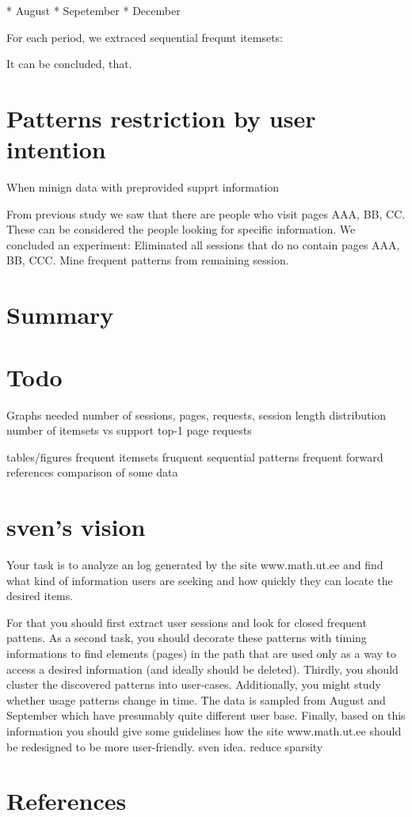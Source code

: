 \documentclass[english,a4paper]{article}
\begin{document}
* August
* Sepetember
* December

For each period, we extraced sequential frequnt itemsets:




It can be concluded, that.


\section{Patterns restriction by user intention}
When minign data with preprovided supprt information

From previous study we saw that there are people who visit pages AAA, BB, CC. These can be considered the people looking for specific information. We concluded an experiment:
Eliminated all sessions that do no contain pages AAA, BB, CCC.
Mine frequent patterns from remaining session.

\section{Summary}

\section{Todo}
Graphs needed
number of sessions, pages, requests, session length distribution
number of itemsets vs support
top-1 page requests

tables/figures
frequent itemsets
fruquent sequential patterns
frequent forward references
comparison of some data

\section{sven's vision}
Your task is to analyze an log generated by the site www.math.ut.ee and find what kind of information users are seeking and how quickly they can locate the desired items. 

For that you should first extract user sessions and look for closed frequent pattens.
As a second task, you should decorate these patterns with timing informations to find elements (pages) in the path that are used only as a way to access a desired information (and ideally should be deleted).
Thirdly, you should cluster the discovered patterns into user-cases.
Additionally, you might study whether usage patterns change in time.
 The data is sampled from August and September which have presumably quite different user base.
 Finally, based on this information you should give some guidelines how the site www.math.ut.ee should be redesigned to be more user-friendly.
 sven idea. reduce sparsity


\section*{References}


\end{document}
